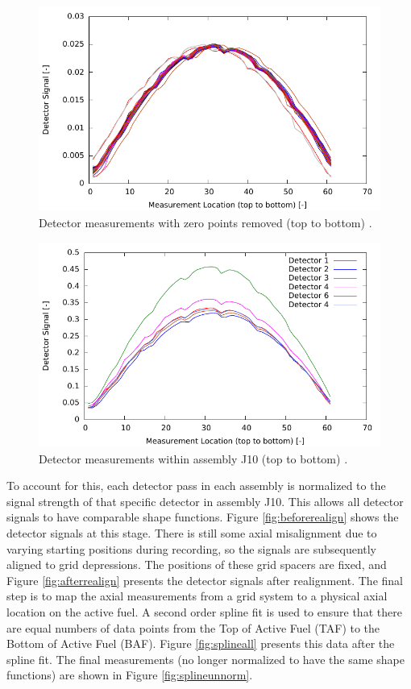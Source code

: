 \documentclass{article}
\begin{document}
\begin{figure}[!htb]
    \centering
    \includegraphics[width=4.5in]{figures/zeros_all.pdf}
    \caption{Detector measurements with zero points removed (top to bottom) \cite{beavrs}. \label{fig:zero}}
\end{figure}

\begin{figure}[!htb]
    \centering
    \includegraphics[width=4.5in]{figures/zeros.pdf}
    \caption{Detector measurements within assembly J10 (top to bottom) \cite{beavrs}. \label{fig:J10}}
\end{figure}

To account for this, each detector pass in each assembly is normalized to the signal strength of that specific detector in assembly J10. This allows all detector signals to have comparable shape functions. Figure \ref{fig:beforerealign} shows the detector signals at this stage. There is still some axial misalignment due to varying starting positions during recording, so the signals are subsequently aligned to grid depressions. The positions of these grid spacers are fixed, and Figure \ref{fig:afterrealign} presents the detector signals after realignment. The final step is to map the axial measurements from a grid system to a physical axial location on the active fuel. A second order spline fit is used to ensure that there are equal numbers of data points from the Top of Active Fuel (TAF) to the Bottom of Active Fuel (BAF). Figure \ref{fig:splineall} presents this data after the spline fit. The final measurements (no longer normalized to have the same shape functions)     are shown in Figure \ref{fig:splineunnorm}.
\end{document}
